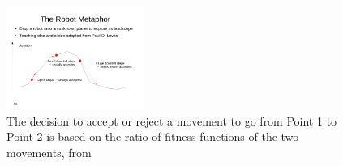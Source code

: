 \begin{figure}
	\begin{center}
		\includegraphics[trim = 0cm 4cm 1cm 7cm, clip, width=0.4\textwidth]{lecture12-seiten-48}
	\end{center}
	\caption{The decision to accept or reject a movement to go from Point 1 to Point 2 is based on the ratio of fitness functions of the two movements, from \cite{MCMC}}
	\label{fig:MCMC2}
\end{figure}